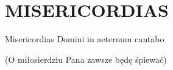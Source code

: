 \documentclass[../../../songbook.tex]{subfiles}
\begin{document}
\TabPositions{8cm} %
\section*{MISERICORDIAS}
{}
\vspace{0.5cm}
Misericordias Domini		 \newline
in aeternum cantabo			 \newline


{\footnotesize
(O miłosierdziu Pana zawsze będę śpiewać)
}
\end{document}
